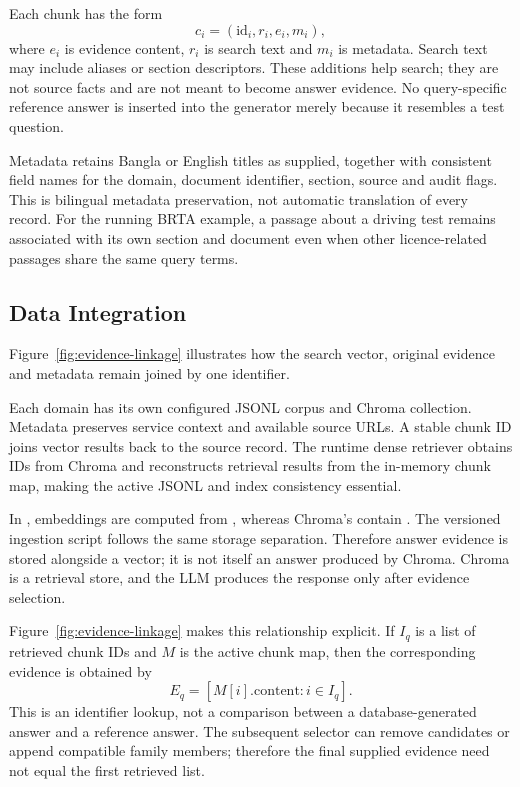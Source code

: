 Each chunk has the form
\begin{equation}
c_i=(\mathrm{id}_i,r_i,e_i,m_i),
\end{equation}
where $e_i$ is evidence content, $r_i$ is search text and $m_i$ is metadata. Search text may include aliases or section descriptors. These additions help search; they are not source facts and are not meant to become answer evidence. No query-specific reference answer is inserted into the generator merely because it resembles a test question.

Metadata retains Bangla or English titles as supplied, together with consistent field names for the domain, document identifier, section, source and audit flags. This is bilingual metadata preservation, not automatic translation of every record. For the running BRTA example, a passage about a driving test remains associated with its own section and document even when other licence-related passages share the same query terms.

\subsection{Data Integration}
Figure~\ref{fig:evidence-linkage} illustrates how the search vector, original evidence and metadata remain joined by one identifier.

Each domain has its own configured JSONL corpus and Chroma collection. Metadata preserves service context and available source URLs. A stable chunk ID joins vector results back to the source record. The runtime dense retriever obtains IDs from Chroma and reconstructs retrieval results from the in-memory chunk map, making the active JSONL and index consistency essential.

In , embeddings are computed from , whereas Chroma's  contain . The versioned ingestion script follows the same storage separation. Therefore answer evidence is stored alongside a vector; it is not itself an answer produced by Chroma. Chroma is a retrieval store, and the LLM produces the response only after evidence selection.

Figure~\ref{fig:evidence-linkage} makes this relationship explicit. If $I_q$ is a list of retrieved chunk IDs and $M$ is the active chunk map, then the corresponding evidence is obtained by
\begin{equation}
E_q=[M[i].\mathrm{content}:i\in I_q].
\end{equation}
This is an identifier lookup, not a comparison between a database-generated answer and a reference answer. The subsequent selector can remove candidates or append compatible family members; therefore the final supplied evidence need not equal the first retrieved list.

